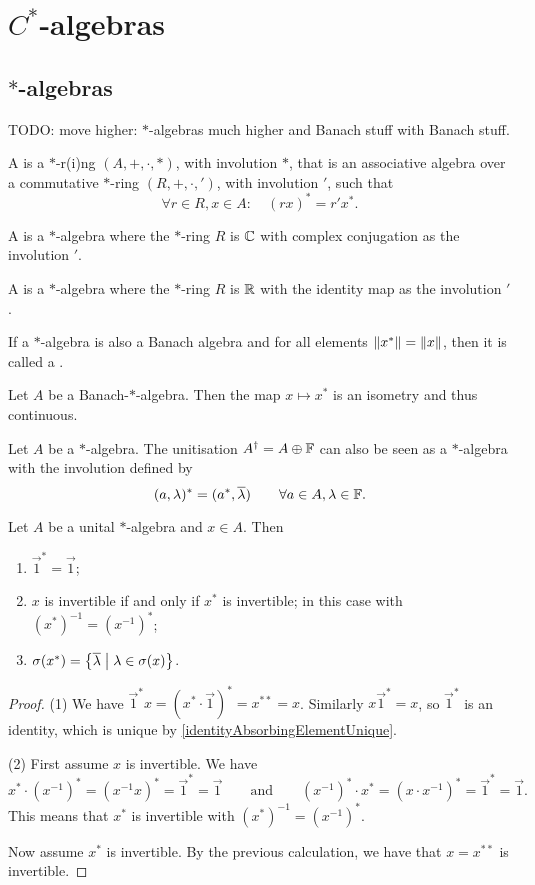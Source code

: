 \chapter{$C^*$-algebras}
\section{$*$-algebras}
TODO: move higher: $*$-algebras much higher and Banach stuff with Banach stuff.
\begin{definition}
A  is a $*$-r(i)ng $(A,+,\cdot, *)$, with involution $*$, that is an associative algebra over a commutative $*$-ring $(R,+,\cdot, ')$, with involution $'$,
such that
\[ \forall r\in R, x\in A: \quad (rx)^* = r'x^*. \]

A  is a $*$-algebra where the $*$-ring $R$ is $\mathbb{C}$ with complex conjugation as the involution $'$.

A  is a $*$-algebra where the $*$-ring $R$ is $\mathbb{R}$ with the identity map as the involution $'$.

If a $*$-algebra is also a Banach algebra and for all elements $\lVert x^*\rVert =\lVert x\rVert$, then it is called a .
\end{definition}

\begin{lemma} \label{starIsometry}
Let $A$ be a Banach-$*$-algebra. Then the map $x\mapsto x^*$ is an isometry and thus continuous.
\end{lemma}

\begin{lemma}
Let $A$ be a $*$-algebra. The unitisation $A^\dagger = A\oplus \mathbb{F}$ can also be seen as a $*$-algebra with the involution defined by
\[ (a, \lambda)^* = (a^*, \overline{\lambda}) \qquad \forall a\in A, \lambda\in \mathbb{F}.\]
\end{lemma}
\begin{lemma} \label{elementaryStarLemma}
Let $A$ be a unital $*$-algebra and $x\in A$. Then
\begin{enumerate}
\item $\vec{1}^* = \vec{1}$;
\item $x$ is invertible \textup{if and only if} $x^*$ is invertible; in this case with $(x^*)^{-1} = (x^{-1})^*$;
\item $\sigma(x^*) = \setbuilder{\overline{\lambda}}{\lambda \in \sigma(x)}$.
\end{enumerate}
\end{lemma}
\begin{proof}
(1) We have $\vec{1}^* x = (x^*\cdot \vec{1})^* = x^{**} = x$.
Similarly $x\vec{1}^* = x$, so $\vec{1}^*$ is an identity, which is unique by \ref{identityAbsorbingElementUnique}.

(2) First assume $x$ is invertible. We have
\[ x^*\cdot (x^{-1})^* = (x^{-1}x)^* = \vec{1}^* = \vec{1} \qquad\text{and}\qquad (x^{-1})^*\cdot x^* = (x\cdot x^{-1})^* = \vec{1}^* = \vec{1}. \]
This means that $x^*$ is invertible with $(x^*)^{-1} = (x^{-1})^*$.

Now assume $x^*$ is invertible. By the previous calculation, we have that $x = x^{**}$ is invertible.
\end{proof}

